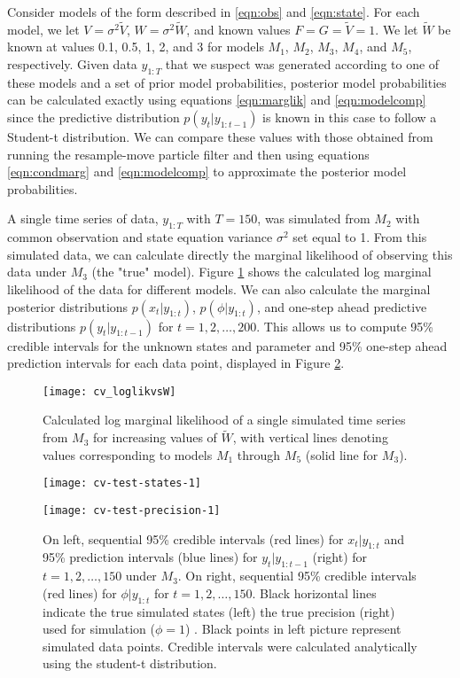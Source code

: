 \documentclass{article}
\begin{document}
Consider models of the form described in \eqref{eqn:obs} and \eqref{eqn:state}. For each model, we let $V = \sigma^2\tilde{V}$, $W = \sigma^2\tilde{W}$, and known values $F = G = \tilde{V} = 1$. We let $\tilde{W}$ be known at values 0.1, 0.5, 1, 2, and 3 for models $M_1$, $M_2$, $M_3$, $M_4$, and $M_5$, respectively. Given data $y_{1:T}$ that we suspect was generated according to one of these models and a set of prior model probabilities, posterior model probabilities can be calculated exactly using equations \eqref{eqn:marglik} and \eqref{eqn:modelcomp} since the predictive distribution $p(y_t|y_{1:t-1})$ is known in this case to follow a Student-t distribution. We can compare these values with those obtained from running the resample-move particle filter and then using equations \eqref{eqn:condmarg} and \eqref{eqn:modelcomp} to approximate the posterior model probabilities.

A single time series of data, $y_{1:T}$ with $T = 150$, was simulated from $M_2$ with common observation and state equation variance $\sigma^2$ set equal to 1. From this simulated data, we can calculate directly the marginal likelihood of observing this data under $M_3$ (the "true" model). Figure \ref{fig:loglikvW} shows the calculated log marginal likelihood of the data for different models. We can also calculate the marginal posterior distributions $p(x_t|y_{1:t})$, $p(\phi|y_{1:t})$, and one-step ahead predictive distributions $p(y_t|y_{1:t-1})$ for $t = 1,2,\ldots,200$. This allows us to compute 95\% credible intervals for the unknown states and parameter and 95\% one-step ahead prediction intervals for each data point, displayed in Figure \ref{fig:sim}.

\begin{figure}
\texttt{[image: cv\_loglikvsW]}
\caption{Calculated log marginal likelihood of a single simulated time series from $M_3$ for increasing values of $\tilde{W}$, with vertical lines denoting values corresponding to models $M_1$ through $M_5$ (solid line for $M_3$).} \label{fig:loglikvW}
\end{figure}

\begin{figure}
\begin{minipage}{0.5\textwidth}
\texttt{[image: cv-test-states-1]}
\end{minipage}
\begin{minipage}{0.5\textwidth}
\texttt{[image: cv-test-precision-1]}
\end{minipage}
\caption{On left, sequential 95\% credible intervals (red lines) for $x_t|y_{1:t}$ and 95\% prediction intervals (blue lines) for $y_t|y_{1:t-1}$ (right) for $t = 1, 2, \ldots, 150$ under $M_3$. On right, sequential 95\% credible intervals (red lines) for $\phi|y_{1:t}$ for $t = 1, 2, \ldots, 150$. Black horizontal lines indicate the true simulated states (left) the true precision (right) used for simulation ($\phi = 1$) . Black points in left picture represent simulated data points. Credible intervals were calculated analytically using the student-t distribution.} \label{fig:sim}
\end{figure}
\end{document}
